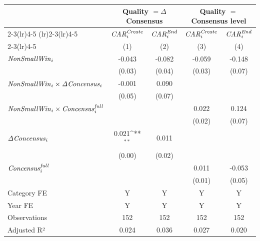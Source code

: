 {
\def\sym#1{\ifmmode^{#1}\else\(^{#1}\)\fi}
\begin{tabular}{l*{4}{c}}
\toprule
                    &\multicolumn{2}{c}{Quality $=\Delta$ Consensus}&\multicolumn{2}{c}{Quality $=$ Consensus level}\\\cmidrule(lr){2-3}\cmidrule(lr){4-5}
\cmidrule(lr){2-3}\cmidrule(lr){4-5} & \multicolumn{1}{c}{${\it CAR}^{\it Create}_{i}$} & \multicolumn{1}{c}{${\it CAR}^{\it End}_{i}$} & \multicolumn{1}{c}{${\it CAR}^{\it Create}_{i}$} & \multicolumn{1}{c}{${\it CAR}^{\it End}_{i}$} \\ \cmidrule(lr){2-3}\cmidrule(lr){4-5} & \multicolumn{1}{c}{(1)} & \multicolumn{1}{c}{(2)} & \multicolumn{1}{c}{(3)} & \multicolumn{1}{c}{(4)} \\ \midrule
${\it NonSmallWin}_{i}$&      -0.043         &      -0.082         &      -0.059         &      -0.148         \\
                    &      (0.03)         &      (0.04)         &      (0.03)         &      (0.07)         \\
${\it NonSmallWin}_{i} \times {\it \Delta Concensus}_{i}$&      -0.001         &       0.090         &                     &                     \\
                    &      (0.05)         &      (0.07)         &                     &                     \\
${\it NonSmallWin}_{i} \times {\it Concensus}^{\it full}_{i}$&                     &                     &       0.022         &       0.124         \\
                    &                     &                     &      (0.02)         &      (0.07)         \\
${\it \Delta Concensus}_{i}$&       0.021\sym{**} &       0.011         &                     &                     \\
                    &      (0.00)         &      (0.02)         &                     &                     \\
${\it Concensus}^{\it full}_{i}$&                     &                     &       0.011         &      -0.053         \\
                    &                     &                     &      (0.01)         &      (0.05)         \\
\midrule
Category FE         &           Y         &           Y         &           Y         &           Y         \\
Year FE             &           Y         &           Y         &           Y         &           Y         \\
Observations        &         152         &         152         &         152         &         152         \\
Adjusted R²         &       0.024         &       0.036         &       0.027         &       0.020         \\
\bottomrule
\end{tabular}
}
